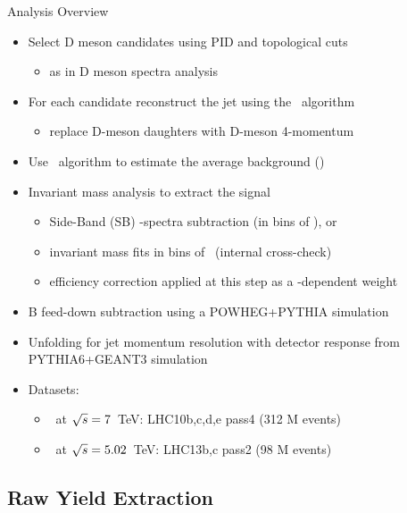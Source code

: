 \documentclass[xcolor={usenames,dvipsnames}]{beamer}
\begin{document}
\begin{frame}{Analysis Overview}
\begin{itemize}
\item \alert{Select D meson candidates using PID and topological cuts}
\begin{itemize}
\item as in D meson spectra analysis
\end{itemize}
\item \alert{For each candidate reconstruct the jet using the \antikt\ algorithm}
\begin{itemize}
\item replace D-meson daughters with D-meson 4-momentum
\end{itemize}
\item Use \kt\ algorithm to estimate the average background (\pPb)
\item Invariant mass analysis to extract the signal
\begin{itemize}
\item \alert{Side-Band (SB) \ptjet-spectra subtraction (in bins of \ptd)}, or
\item invariant mass fits in bins of \ptjet\ (internal cross-check)
\item efficiency correction applied at this step as a \ptd-dependent weight
\end{itemize}
\item \alert{B feed-down subtraction} using a POWHEG+PYTHIA simulation
\item \alert{Unfolding for jet momentum resolution} with detector response from PYTHIA6+GEANT3 simulation
\item Datasets:
\begin{itemize}
\item \pp\ at $\sqrt{s}=7$~TeV: LHC10b,c,d,e pass4 (312 M events)
\item \pPb\ at $\sqrt{s}=5.02$~TeV: LHC13b,c pass2 (98 M events)
\end{itemize}
\end{itemize}
\end{frame}

\subsection{Raw Yield Extraction}
\end{document}
